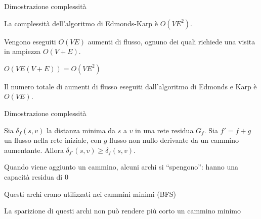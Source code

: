 \begin{frame}{Dimostrazione complessità}

\vspace{-9pt}
\begin{myboxtitle}[Teorema]
La complessità dell'algoritmo di Edmonds-Karp è $O(VE^2)$.
\end{myboxtitle}
\BIL
\item Vengono eseguiti $O(VE)$ aumenti di flusso, ognuno dei quali richiede
una visita in ampiezza $O(V+E)$.
\item $O(VE(V+E)) = O(VE^2)$
\EIL

\begin{myboxtitle}
Il numero totale di aumenti di flusso eseguiti dall'algoritmo
di Edmonds e Karp è $O(VE)$.
\end{myboxtitle}

\end{frame}

\begin{frame}{Dimostrazione complessità}

\vspace{-9pt}
\begin{myboxtitle}
Sia $\delta_f(s,v)$ la distanza minima da $s$ a $v$ in una rete residua $G_f$.
Sia $f' = f+g$ un flusso nella rete iniziale, con $g$ flusso non nullo derivante
da un cammino aumentante. Allora $\delta_{f'}(s,v) \geq \delta_f(s,v)$.
\end{myboxtitle}  
\BIL
  \item Quando viene aggiunto un cammino, alcuni archi si  ``spengono'': hanno una capacità residua di 0
  \item Questi archi erano utilizzati nei cammini minimi (BFS)
  \item La sparizione di questi archi non può rendere più corto un cammino minimo
\EIL

\end{frame}

